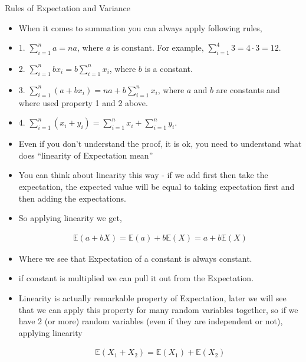 \documentclass[8pt, usepdftitle=false]{beamer}
\begin{document}
\begin{frame}[allowframebreaks]{Rules of Expectation and Variance}
\begin{itemize}
\item When it comes to summation you can always apply following rules, 

\item 1. $\sum_{i=1}^n a=n a$, where $a$ is constant. For example, $\sum_{i=1}^4 3=4 \cdot 3=12$.
\medskip
\item 2. $\sum_{i=1}^n b x_i = b \sum_{i=1}^n x_i$, where $b$ is a constant.
\medskip
\item 3. $\sum_{i=1}^n\left(a+b x_i\right)=n a+b \sum_{i=1}^n x_i$, where $a$ and $b$ are constants and where used property 1 and 2 above.

\medskip
\item 4. $\sum_{i=1}^n\left(x_i+y_i\right)=\sum_{i=1}^n x_i+\sum_{i=1}^n y_i$.



\item Even if you don't understand the proof, it is ok, you need to understand what does \alert{``linearity of Expectation mean''}

\item You can think about linearity this way - \alert{if we add first then take the expectation, the expected value will be equal to taking expectation first and then adding the expectations}.

\item So applying linearity we get,

\begin{align*}
\mathbb{E}(a + bX) =  \mathbb{E}(a) + b \mathbb{E}(X) = a +  b \mathbb{E}(X)
\end{align*}

\item Where we see that Expectation of a constant is always constant.

\item if constant is multiplied we can pull it out from the Expectation.

\item Linearity is actually remarkable property of Expectation, later we will see that we can apply this property for many random variables together, so if we have $2$ (or more) random variables (\alert{even if they are independent or not}), applying linearity 

\begin{align*}
\mathbb{E}(X_1 + X_2) = \mathbb{E}(X_1) + \mathbb{E}(X_2)
\end{align*}






\end{itemize}
\end{frame}
\end{document}
